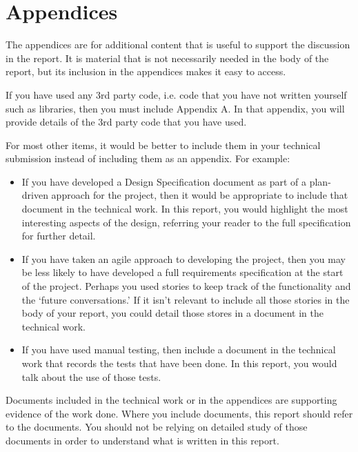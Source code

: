 \documentclass[11pt,a4paper]{report}
\begin{document}


\setemptyheader

\chapter*{Appendices}
The appendices are for additional content that is useful to support the discussion in the report. It is material that is not necessarily needed in the body of the report, but its inclusion in the appendices makes it easy to access.

If you have used any 3rd party code, i.e. code that you have not written yourself such as libraries, then you must include Appendix A. In that appendix, you will provide details of the 3rd party code that you have used. 

For most other items, it would be better to include them in your technical submission instead of including them as an appendix. For example:

\begin{itemize}
    \item If you have developed a Design Specification document as part of a plan-driven approach for the project, then it would be appropriate to include that document in the technical work. In this report, you would highlight the most interesting aspects of the design, referring your reader to the full specification for further detail.
    \item If you have taken an agile approach to developing the project, then you may be less likely to have developed a full requirements specification at the start of the project. Perhaps you used stories to keep track of the functionality and the ‘future conversations.’ If it isn’t relevant to include all those stories in the body of your report, you could detail those stores in a document in the technical work.
    \item If you have used manual testing, then include a document in the technical work that records the tests that have been done. In this report, you would talk about the use of those tests.
\end{itemize}

Documents included in the technical work or in the appendices are supporting evidence of the work done. Where you include documents, this report should refer to the documents. You should not be relying on detailed study of those documents in order to understand what is written in this report. 
\end{document}
